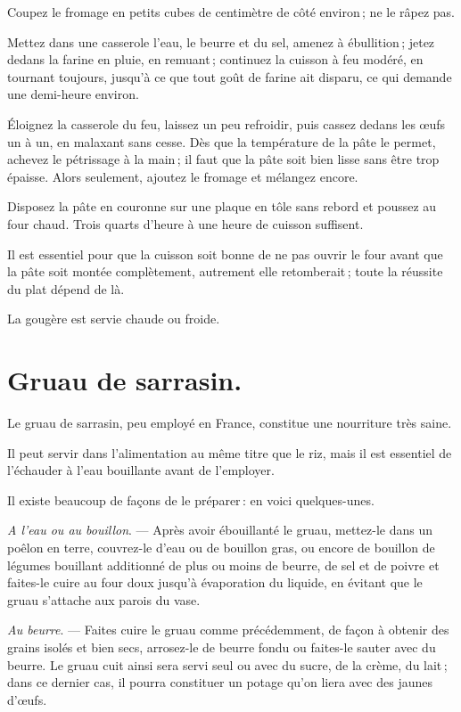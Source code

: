 Coupez le fromage en petits cubes de {\mmm} centimètre de côté environ ;
ne le râpez pas.

Mettez dans une casserole l'eau, le beurre et du sel, amenez à ébullition ;
jetez dedans la farine en pluie, en remuant ; continuez la cuisson à feu
modéré, en tournant toujours, jusqu'à ce que tout goût de farine ait disparu,
ce qui demande une demi-heure environ.

Éloignez la casserole du feu, laissez un peu refroidir, puis cassez dedans les
œufs un à un, en malaxant sans cesse. Dès que la température de la pâte le
permet, achevez le pétrissage à la main ; il faut que la pâte soit bien lisse
sans être trop épaisse. Alors seulement, ajoutez le fromage et mélangez encore.

Disposez la pâte en couronne sur une plaque en tôle sans rebord et poussez au
four chaud. Trois quarts d'heure à une heure de cuisson suffisent.

Il est essentiel pour que la cuisson soit bonne de ne pas ouvrir le four avant
que la pâte soit montée complètement, autrement elle retomberait ; toute la
réussite du plat dépend de là.

La gougère est servie chaude ou froide.

\section*{\centering Gruau de sarrasin.}
{}

Le gruau de sarrasin, peu employé en France, constitue une nourriture très saine.

Il peut servir dans l'alimentation au même titre que le riz, mais il est essentiel
de l'échauder à l'eau bouillante avant de l'employer.

Il existe beaucoup de façons de le préparer : en voici quelques-unes.

\medskip

\textit{A l'eau ou au bouillon}. — Après avoir ébouillanté le gruau, mettez-le dans
un poêlon en terre, couvrez-le d'eau ou de bouillon gras, ou encore de bouillon
de légumes bouillant additionné de plus ou moins de beurre, de sel et de poivre
et faites-le cuire au four doux jusqu'à évaporation du liquide, en évitant que
le gruau s'attache aux parois du vase.

\medskip

\textit{Au beurre}. — Faites cuire le gruau comme précédemment, de façon
à obtenir des grains isolés et bien secs, arrosez-le de beurre fondu ou
faites-le sauter avec du beurre. Le gruau cuit ainsi sera servi seul ou avec du
sucre, de la crème, du lait ; dans ce dernier cas, il pourra constituer un
potage qu'on liera avec des jaunes d'œufs.

